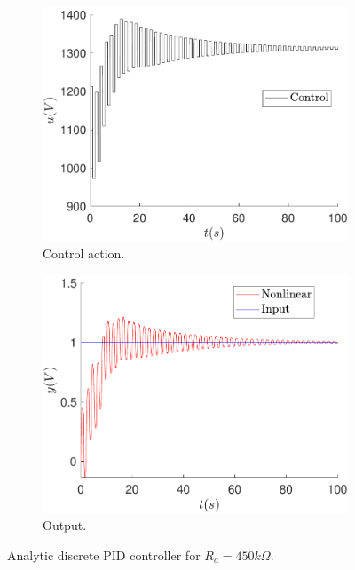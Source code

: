 	\begin{figure}
        \centering
        \begin{subfigure}[b]{0.475\textwidth}
            \centering
            \includegraphics[scale=0.425]{files/sens_analysis/PID/control_analytic_a_450.pdf}
            \caption{Control action.}
        \end{subfigure}
        \vskip0.1cm
        \begin{subfigure}[b]{0.475\textwidth}   
            \centering 
            \includegraphics[scale=0.425]{files/sens_analysis/PID/analytic_sensitivity_a_450.pdf}
            \caption{Output.}
        \end{subfigure}
        \caption{Analytic discrete PID controller for $R_a=450k\Omega$.}
        \label{fig:sens_ra_450}
	\end{figure}
	
